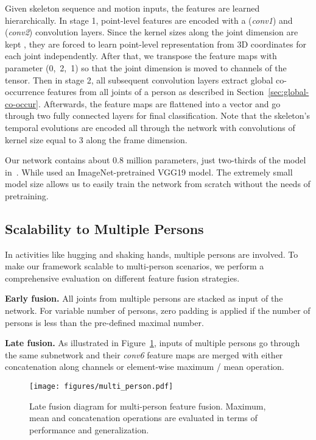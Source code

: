 \documentclass{article}
\begin{document}
Given skeleton sequence and motion inputs, the features are learned hierarchically. In stage 1, point-level features are encoded with a  (\emph{conv1}) and  (\emph{conv2}) convolution layers. Since the kernel sizes along the joint dimension are kept , they are forced to learn point-level representation from 3D coordinates for each joint independently. After that, we transpose the feature maps with parameter (0,~2,~1) so that the joint dimension is moved to channels of the tensor. Then in stage 2, all subsequent convolution layers extract global co-occurrence features from all joints of a person as described in Section~\ref{sec:global-co-occur}. Afterwards, the feature maps are flattened into a vector and go through two fully connected layers for final classification. Note that the skeleton's temporal evolutions are encoded all through the network with convolutions of kernel size equal to 3 along the frame dimension.

Our network contains about 0.8 million parameters, just two-thirds of the model in~\cite{Li_2017_ICMEW}. While \cite{Ke_2017_CVPR} used an ImageNet-pretrained VGG19 model. The extremely small model size allows us to easily train the network from scratch without the needs of pretraining.

\subsection{Scalability to Multiple Persons}
\label{text:multi_person}

In activities like hugging and shaking hands, multiple persons are involved. To make our framework scalable to multi-person scenarios, we perform a comprehensive evaluation on different feature fusion strategies.

{\bfseries Early fusion.} All joints from multiple persons are stacked as input of the network. For variable number of persons, zero padding is applied if the number of persons is less than the pre-defined maximal number.

{\bfseries Late fusion.} As illustrated in Figure~\ref{fig:multi_person}, inputs of multiple persons go through the same subnetwork and their \emph{conv6} feature maps are merged with either concatenation along channels or element-wise maximum / mean operation.

\begin{figure}[tbp]
  \centering
  \texttt{[image: figures/multi\_person.pdf]}
  \caption{Late fusion diagram for multi-person feature fusion. Maximum, mean and concatenation operations are evaluated in terms of performance and generalization.
  \label{fig:multi_person}}
\end{figure}
\end{document}
